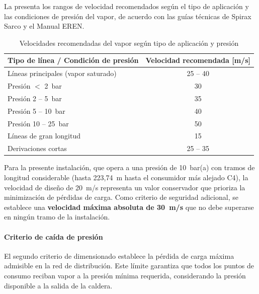 La  presenta los rangos de velocidad recomendados según el tipo de aplicación y las condiciones de presión del vapor, de acuerdo con las guías técnicas de Spirax Sarco y el Manual EREN.

\begin{table}[H]
	\centering
	\caption{Velocidades recomendadas del vapor según tipo de aplicación y presión}
	\label{tab:velocidades-recomendadas}
	\begin{tabular}{lc}
		\toprule
		\textbf{Tipo de línea / Condición de presión} & \textbf{Velocidad recomendada [m/s]} \\
		\midrule
		Líneas principales (vapor saturado)           & 25 -- 40                             \\
		Presión $<$ 2~bar                             & 30                                   \\
		Presión 2 -- 5~bar                            & 35                                   \\
		Presión 5 -- 10~bar                           & 40                                   \\
		Presión 10 -- 25~bar                          & 50                                   \\
		Líneas de gran longitud                       & 15                                   \\
		Derivaciones cortas                           & 25 -- 35                             \\
		\bottomrule
	\end{tabular}
\end{table}

Para la presente instalación, que opera a una presión de 10~bar(a) con tramos de longitud considerable (hasta 223,74~m hasta el consumidor más alejado C4), la velocidad de diseño de 20~m/s representa un valor conservador que prioriza la minimización de pérdidas de carga. Como criterio de seguridad adicional, se establece una \textbf{velocidad máxima absoluta de 30~m/s} que no debe superarse en ningún tramo de la instalación.

\paragraph{Criterio de caída de presión}

El segundo criterio de dimensionado establece la pérdida de carga máxima admisible en la red de distribución. Este límite garantiza que todos los puntos de consumo reciban vapor a la presión mínima requerida, considerando la presión disponible a la salida de la caldera.

